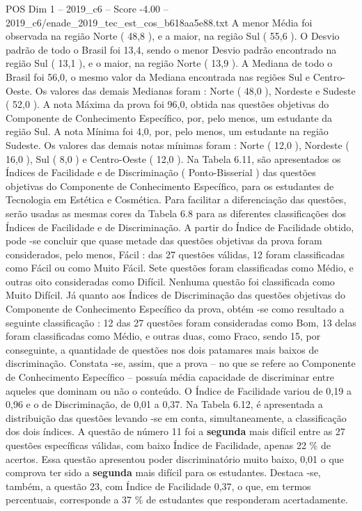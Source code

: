 \begin{textsample}{POS Dim 1 – 2019\_c6 – Score -4.00 – 2019\_c6/enade\_2019\_tec\_est\_cos\_b618aa5e88.txt}
A menor Média foi observada na região Norte ( 48,8 ), e a maior, na região Sul ( 55,6 ).
O Desvio padrão de todo o Brasil foi 13,4, sendo o menor Desvio padrão encontrado na região Sul ( 13,1 ), e o maior, na região Norte ( 13,9 ).
A Mediana de todo o Brasil foi 56,0, o mesmo valor da Mediana encontrada nas regiões Sul e Centro-Oeste.
Os valores das demais Medianas foram : Norte ( 48,0 ), Nordeste e Sudeste ( 52,0 ).
A nota Máxima da prova foi 96,0, obtida nas questões objetivas do Componente de Conhecimento Específico, por, pelo menos, um estudante da região Sul.
A nota Mínima foi 4,0, por, pelo menos, um estudante na região Sudeste.
Os valores das demais notas mínimas foram : Norte ( 12,0 ), Nordeste ( 16,0 ), Sul ( 8,0 ) e Centro-Oeste ( 12,0 ).
Na Tabela 6.11, são apresentados os Índices de Facilidade e de Discriminação ( Ponto-Bisserial ) das questões objetivas do Componente de Conhecimento Específico, para os estudantes de Tecnologia em Estética e Cosmética.
Para facilitar a diferenciação das questões, serão usadas as mesmas cores da Tabela 6.8 para as diferentes classificações dos Índices de Facilidade e de Discriminação.
A partir do Índice de Facilidade obtido, pode -se concluir que quase metade das questões objetivas da prova foram considerados, pelo menos, Fácil : das 27 questões válidas, 12 foram classificadas como Fácil ou como Muito Fácil.
Sete questões foram classificadas como Médio, e outras oito consideradas como Difícil.
Nenhuma questão foi classificada como Muito Difícil.
Já quanto aos Índices de Discriminação das questões objetivas do Componente de Conhecimento Específico da prova, obtém -se como resultado a seguinte classificação : 12 das 27 questões foram consideradas como Bom, 13 delas foram classificadas como Médio, e outras duas, como Fraco, sendo 15, por conseguinte, a quantidade de questões nos dois patamares mais baixos de discriminação.
Constata -se, assim, que a prova – no que se refere ao Componente de Conhecimento Específico – possuía média capacidade de discriminar entre aqueles que dominam ou não o conteúdo.
O Índice de Facilidade variou de 0,19 a 0,96 e o de Discriminação, de 0,01 a 0,37.
Na Tabela 6.12, é apresentada a distribuição das questões levando -se em conta, simultaneamente, a classificação dos dois índices.
A questão de número 11 foi a \textbf{segunda} mais difícil entre as 27 questões específicas válidas, com baixo Índice de Facilidade, apenas 22 \% de acertos.
Essa questão apresentou poder discriminatório muito baixo, 0,01 o que comprova ter sido a \textbf{segunda} mais difícil para os estudantes.
Destaca -se, também, a questão 23, com Índice de Facilidade 0,37, o que, em termos percentuais, corresponde a 37 \% de estudantes que responderam acertadamente.

\end{textsample}
